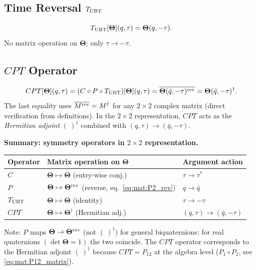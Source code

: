 \documentclass[12pt,a4paper]{article}
\theoremstyle{definition}
\theoremstyle{remark}
\begin{document}
\subsection{Time Reversal $T_{\rm UBT}$}

\begin{equation}
  T_{\rm UBT}[\mathbf{\Theta}](q,\tau) = \mathbf{\Theta}(q,-\tau).
  \label{eq:mat:T_2x2}
\end{equation}
No matrix operation on $\mathbf{\Theta}$; only $\tau\to-\tau$.

\subsection{$CPT$ Operator}

\begin{equation}
  CPT[\mathbf{\Theta}](q,\tau)
  = (C\circ P\circ T_{\rm UBT})[\mathbf{\Theta}](q,\tau)
  = \overline{\mathbf{\Theta}(\bar q,-\tau)^{\rm rev}}
  = \mathbf{\Theta}(\bar q,-\tau)^\dagger.
  \label{eq:mat:CPT_2x2}
\end{equation}
The last equality uses $\overline{M^{\rm rev}} = M^\dagger$ for any $2\times2$
complex matrix (direct verification from definitions).
In the $2\times2$ representation, $CPT$ acts as the \emph{Hermitian adjoint}
$(\ )^\dagger$ combined with $(q,\tau)\to(\bar q,-\tau)$.

\begin{resultbox}
\textbf{Summary: symmetry operators in $2\times2$ representation.}
\begin{center}
\begin{tabular}{@{}lll@{}}
\toprule
Operator & Matrix operation on $\mathbf{\Theta}$ & Argument action \\
\midrule
$C$ & $\mathbf{\Theta} \mapsto \overline{\mathbf{\Theta}}$ (entry-wise conj.) & $\tau\to\tau^*$ \\
$P$ & $\mathbf{\Theta} \mapsto \mathbf{\Theta}^{\rm rev}$ (reverse, eq.~\eqref{eq:mat:P2_rev}) & $q\to\bar q$ \\
$T_{\rm UBT}$ & $\mathbf{\Theta} \mapsto \mathbf{\Theta}$ (identity) & $\tau\to -\tau$ \\
$CPT$ & $\mathbf{\Theta} \mapsto \mathbf{\Theta}^\dagger$ (Hermitian adj.) & $(q,\tau)\to(\bar q,-\tau)$ \\
\bottomrule
\end{tabular}
\end{center}
Note: $P$ maps $\mathbf{\Theta}\to\mathbf{\Theta}^{\rm rev}$ (not $(\ )^\dagger$) for general
biquaternions; for real quaternions $(\det\mathbf{\Theta}=1)$ the two coincide.
The $CPT$ operator corresponds to the Hermitian adjoint $(\ )^\dagger$ because
$CPT = P_{12}$ at the algebra level ($P_1\circ P_2$, see \eqref{eq:mat:P12_matrix}).
\end{resultbox}
\end{document}
